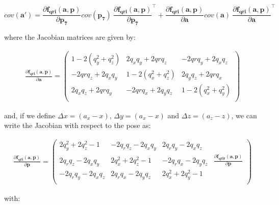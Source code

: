 \documentclass[a4paper,11pt]{report}
\begin{document}
\begin{equation}
cov(\mathbf{a'}) =
\frac{\partial \mathbf{f_{qri}}( \mathbf{a}, \mathbf{p} )}{\partial \mathbf{p_7}}
cov(\mathbf{p_7})  ~
\frac{\partial \mathbf{f_{qri}}( \mathbf{a}, \mathbf{p} )}{\partial \mathbf{p_7}}^\top 
+
\frac{\partial \mathbf{f_{qri}}( \mathbf{a}, \mathbf{p} )}{\partial \mathbf{a}}
cov(\mathbf{a})  ~
\frac{\partial \mathbf{f_{qri}}( \mathbf{a}, \mathbf{p} )}{\partial \mathbf{a}}^\top 
\end{equation}

\noindent where the Jacobian matrices are given by:

\begin{eqnarray}
\frac{ \partial \mathbf{f_{qri}}( \mathbf{a}, \mathbf{p} )}{\partial \mathbf{a}} = 
\left(\begin{array}{ccc} 
1 - 2 (q_y^2 + q_z^2)   &    2 q_x q_y + 2 qr q_z  &     - 2 qr q_y + 2 q_x q_z \\
-2 qr q_z + 2 q_x q_y &   1 - 2 (q_x^2 + q_z^2) &   2 q_y q_z + 2 qr q_x \\
2 q_x q_z + 2 qr q_y &   -2 qr q_x + 2 q_y q_z & 1 - 2 (q_x^2 + q_y^2 ) \\
\end{array}\right) 
\end{eqnarray}

\noindent and, if we define 
$\Delta x = (a_x - x)$, $\Delta y = (a_x - x)$ and $\Delta z = (a_z - z)$, we can 
write the Jacobian with respect to the pose as:

\begin{eqnarray}
\label{eq:df_qri_p}
\frac{ \partial \mathbf{f_{qri}}( \mathbf{a}, \mathbf{p} )}{\partial \mathbf{p}} = 
\left(\begin{array}{ccc|c} 
2 q_y^2 + 2 q_z^2 - 1 &   -2 q_r q_z - 2 q_x q_y &  2 q_r q_y - 2 q_x q_z &  ~ 
\\
2 q_r q_z - 2 q_x q_y &  2 q_x^2 + 2 q_z^2 - 1   &  -2 q_r q_x - 2 q_y q_z &  
  \frac{ \partial \mathbf{f_{qrir}}( \mathbf{a}, \mathbf{p} )}{\partial \mathbf{p}}
\\
-2 q_r q_y - 2 q_x q_z &  2 q_r q_x - 2 q_y q_z &  2 q_x^2 + 2 q_y^2 - 1 & ~
\\
\end{array}\right) 
\end{eqnarray}

\noindent with:
\end{document}
